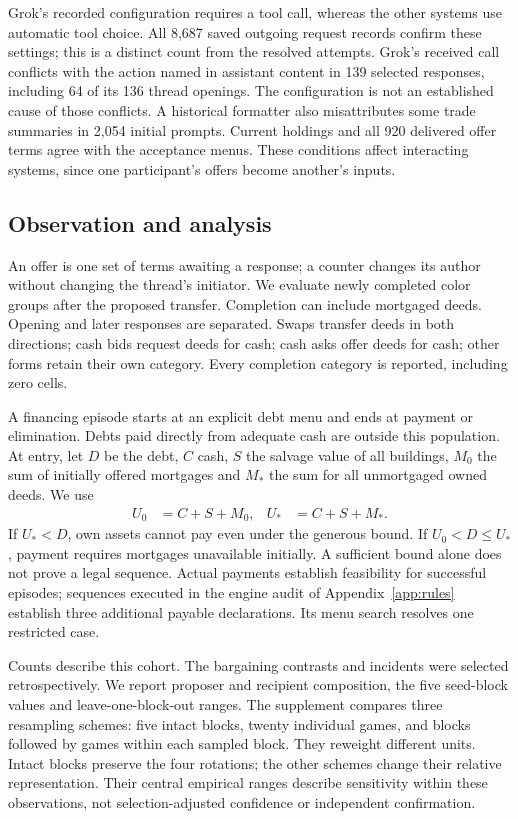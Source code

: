 Grok's recorded configuration requires a tool call, whereas the other systems use automatic tool choice. All 8,687 saved outgoing request records confirm these settings; this is a distinct count from the resolved attempts. Grok's received call conflicts with the action named in assistant content in 139 selected responses, including 64 of its 136 thread openings. The configuration is not an established cause of those conflicts. A historical formatter also misattributes some trade summaries in 2,054 initial prompts. Current holdings and all 920 delivered offer terms agree with the acceptance menus. These conditions affect interacting systems, since one participant's offers become another's inputs.

\subsection{Observation and analysis}
An offer is one set of terms awaiting a response; a counter changes its author without changing the thread's initiator. We evaluate newly completed color groups after the proposed transfer. Completion can include mortgaged deeds. Opening and later responses are separated. Swaps transfer deeds in both directions; cash bids request deeds for cash; cash asks offer deeds for cash; other forms retain their own category. Every completion category is reported, including zero cells.

A financing episode starts at an explicit debt menu and ends at payment or elimination. Debts paid directly from adequate cash are outside this population. At entry, let $D$ be the debt, $C$ cash, $S$ the salvage value of all buildings, $M_0$ the sum of initially offered mortgages and $M_*$ the sum for all unmortgaged owned deeds. We use
\begin{align}
U_0&=C+S+M_0, & U_*&=C+S+M_*.
\end{align}
If $U_*<D$, own assets cannot pay even under the generous bound. If $U_0<D\leq U_*$, payment requires mortgages unavailable initially. A sufficient bound alone does not prove a legal sequence. Actual payments establish feasibility for successful episodes; sequences executed in the engine audit of Appendix~\ref{app:rules} establish three additional payable declarations. Its menu search resolves one restricted case.

Counts describe this cohort. The bargaining contrasts and incidents were selected retrospectively. We report proposer and recipient composition, the five seed-block values and leave-one-block-out ranges. The supplement compares three resampling schemes: five intact blocks, twenty individual games, and blocks followed by games within each sampled block. They reweight different units. Intact blocks preserve the four rotations; the other schemes change their relative representation. Their central empirical ranges describe sensitivity within these observations, not selection-adjusted confidence or independent confirmation.

